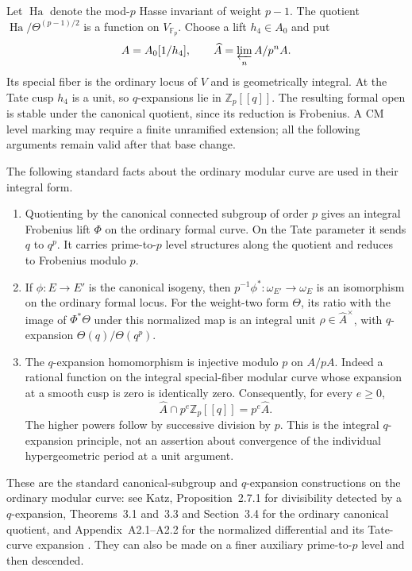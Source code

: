 \documentclass[11pt,a4paper]{article}
\begin{document}
Let $\operatorname{Ha}$ denote the mod-$p$ Hasse invariant of weight
$p-1$. The quotient
$\operatorname{Ha}/\Theta^{(p-1)/2}$ is a function on $V_{\mathbb F_p}$.
Choose a lift $h_4\in A_0$ and put
\[
 A=A_0[1/h_4],\qquad \widehat A=\varprojlim_n A/p^nA.
\]
Its special fiber is the ordinary locus of $V$ and is geometrically
integral. At the Tate cusp $h_4$ is a unit, so $q$-expansions lie in
$\mathbb Z_p[[q]]$. The resulting formal open is stable under the
canonical quotient, since its reduction is Frobenius. A CM level
marking may require a finite unramified extension; all the following
arguments remain valid after that base change.

The following standard facts about the ordinary
modular curve are used in their integral form.

\begin{enumerate}
\item Quotienting by the canonical connected subgroup of order $p$ gives
an integral Frobenius lift $\Phi$ on the ordinary formal curve.  On the
Tate parameter it sends $q$ to $q^p$.  It carries prime-to-$p$ level
structures along the quotient and reduces to Frobenius modulo $p$.
\item If $\phi:E\to E'$ is the canonical isogeny, then
$p^{-1}\phi^*: \omega_{E'}\to\omega_E$ is an isomorphism on the ordinary
formal locus.  For the weight-two form $\Theta$, its ratio with the
image of $\Phi^*\Theta$ under this normalized map is an integral unit
$\rho\in\widehat A^\times$, with $q$-expansion
$\Theta(q)/\Theta(q^p)$.
\item The $q$-expansion homomorphism is injective modulo $p$ on $A/pA$.
Indeed a rational function on the integral special-fiber modular curve
whose expansion at a smooth cusp is zero is identically zero.
Consequently, for every $e\geq0$,
\begin{equation}\label{raw:saturation}
 \widehat A\cap p^e\mathbb Z_p[[q]]=p^e\widehat A.
\end{equation}
The higher powers follow by successive division by $p$.  This is the
integral $q$-expansion principle, not an assertion about convergence of
the individual hypergeometric period at a unit argument.
\end{enumerate}
These are the standard canonical-subgroup and $q$-expansion constructions
on the ordinary modular curve: see Katz, Proposition~2.7.1 for
divisibility detected by a $q$-expansion, Theorems~3.1 and~3.3 and
Section~3.4 for the ordinary canonical quotient, and Appendix~A2.1--A2.2
for the normalized differential and its Tate-curve expansion \cite{Katz}.  They can
also be made on a finer auxiliary prime-to-$p$ level and then descended.
\end{document}
